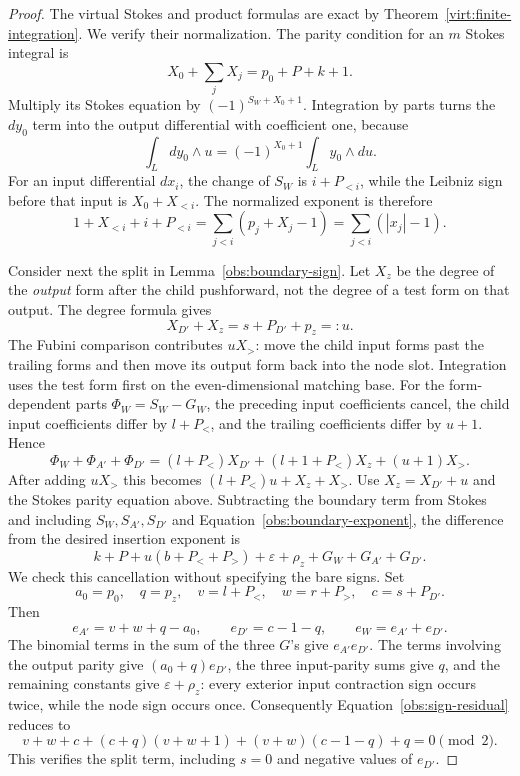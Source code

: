 \begin{proof}
The virtual Stokes and product formulas are exact by
Theorem~\ref{virt:finite-integration}.  We verify their normalization.
The parity condition for an $m$ Stokes integral is
\[
 X_0+\sum_jX_j=p_0+P+k+1.
\]
Multiply its Stokes equation by $(-1)^{S_W+X_0+1}$.
Integration by parts turns the $dy_0$ term into the output
differential with coefficient one, because
\[
 \int_Ldy_0\wedge u=(-1)^{X_0+1}\int_Ly_0\wedge du.
\]
For an input differential $dx_i$, the change of $S_W$ is
$i+P_{<i}$, while the Leibniz sign before that input is
$X_0+X_{<i}$.  The normalized exponent is therefore
\[
 1+X_{<i}+i+P_{<i}
 =\sum_{j<i}(p_j+X_j-1)
 =\sum_{j<i}(|x_j|-1).
\]

Consider next the split in Lemma~\ref{obs:boundary-sign}.  Let
$X_z$ be the degree of the \emph{output} form after the child
pushforward, not the degree of a test form on that output.  The
degree formula gives
\[
 X_{D'}+X_z=s+P_{D'}+p_z=:u.
\]
The Fubini comparison contributes $uX_>$: move the child input
forms past the trailing forms and then move its output form back
into the node slot.  Integration uses the test form first on the
even-dimensional matching base.  For the form-dependent parts
$\Phi_W=S_W-G_W$, the preceding input coefficients cancel,
the child input coefficients differ by $l+P_<$, and the
trailing coefficients differ by $u+1$.  Hence
\[
 \Phi_W+\Phi_{A'}+\Phi_{D'}
 =(l+P_<)X_{D'}+(l+1+P_<)X_z+(u+1)X_>.
\]
After adding $uX_>$ this becomes
$(l+P_<)u+X_z+X_>$.  Use
$X_z=X_{D'}+u$ and the Stokes parity equation above.
Subtracting the boundary term
from Stokes and including $S_W,S_{A'},S_{D'}$ and
Equation~\eqref{obs:boundary-exponent}, the difference from the
desired insertion exponent is
\begin{equation}
 \label{obs:sign-residual}
 k+P+u(b+P_<+P_>)+\varepsilon+\rho_z
          +G_W+G_{A'}+G_{D'}.
\end{equation}
We check this cancellation without specifying the bare signs.
Set
\[
 a_0=p_0,\quad q=p_z,\quad
 v=l+P_<,\quad w=r+P_>,\quad c=s+P_{D'}.
\]
Then
\[
 e_{A'}=v+w+q-a_0,\qquad e_{D'}=c-1-q,
 \qquad e_W=e_{A'}+e_{D'}.
\]
The binomial terms in the sum of the three $G$'s give
$e_{A'}e_{D'}$.  The terms involving the output parity give
$(a_0+q)e_{D'}$, the three input-parity sums give $q$, and the
remaining constants give $\varepsilon+\rho_z$: every exterior
input contraction sign occurs twice, while the node sign occurs
once.  Consequently Equation~\eqref{obs:sign-residual} reduces to
\[
 v+w+c+(c+q)(v+w+1)+(v+w)(c-1-q)+q=0
 \pmod2.
\]
This verifies the split term, including $s=0$ and negative values
of $e_{D'}$.


\end{proof}
